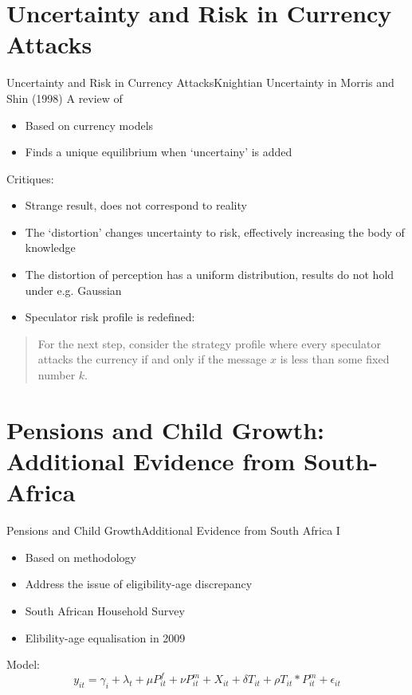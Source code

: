 \documentclass{beamer}
\begin{document}
\section[Uncertainty, Currency Attacks]{Uncertainty and Risk in Currency Attacks}

\begin{frame}{Uncertainty and Risk in Currency Attacks}{Knightian Uncertainty in Morris and Shin (1998)}
A review of  \parencite{morris1998unique}
\begin{itemize}
	\item Based on currency models \textcite{obstfeld1986rational,obstfeld1995logic,obstfeld1996models}
	\item Finds a unique equilibrium when `uncertainy' is added
\end{itemize}
Critiques:
\begin{itemize}
	\item Strange result, does not correspond to reality
	\item The `distortion' changes uncertainty to risk, effectively increasing the body of knowledge
	\item The distortion of perception has a uniform distribution, results do not hold under e.g. Gaussian
	\item Speculator risk profile is redefined:
\end{itemize}
\begin{quotation}
	For the next step,
	consider the strategy profile where every speculator attacks the currency if and only if
	the message $x$ is less than some fixed number $k$.
	\parencite[p.~592]{morris1998unique}
\end{quotation}
\end{frame}

\section[Pensions, Child Growth]{Pensions and Child Growth: Additional Evidence from South-Africa}

\begin{frame}{Pensions and Child Growth}{Additional Evidence from South Africa I}
	\begin{itemize}
		\item Based on  \parencite{duflo2000child,duflo2003grandmothers} methodology
		\item Address the issue of eligibility-age discrepancy
		\item South African Household Survey \parencite{saldru2008nids,saldru2012nids,saldru2013nids}
		\item Elibility-age equalisation in 2009
	\end{itemize}
	Model:
	\setcounter{equation}{2}
	\begin{equation}
		\label{sa:eq:interaction}
		y_{it} = \gamma_i + \lambda_t + \mu P^f_{it} + \nu P^m_{it} + X_{it} + \delta T_{it} + \rho T_{it}*P^m_{it} + \epsilon_{it}
		\end{equation}
\end{frame}
\end{document}
